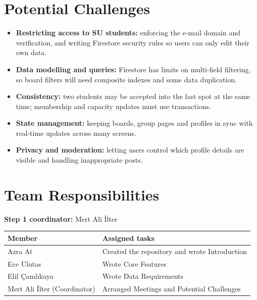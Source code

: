 \documentclass[11pt,a4paper]{article}
\begin{document}
\section{Potential Challenges}

\begin{itemize}
  \item \textbf{Restricting access to SU students:} enforcing the e-mail
        domain and verification, and writing Firestore security rules so users
        can only edit their own data.
  \item \textbf{Data modelling and queries:} Firestore has limits on
        multi-field filtering, so board filters will need composite indexes
        and some data duplication.
  \item \textbf{Consistency:} two students may be accepted into the last spot
        at the same time; membership and capacity updates must use
        transactions.
  \item \textbf{State management:} keeping boards, group pages and profiles
        in sync with real-time updates across many screens.
  \item \textbf{Privacy and moderation:} letting users control which profile
        details are visible and handling inappropriate posts.
\end{itemize}

\section{Team Responsibilities}

\textbf{Step 1 coordinator:} Mert Ali İlter 

\vspace{0.5ex}
\begin{tabularx}{\textwidth}{@{}lX@{}}
  \toprule
  \textbf{Member} & \textbf{Assigned tasks} \\
  \midrule
  Azra At & Created the repository and wrote Introduction \\
  Ece Ulutas & Wrote Core Features \\
  Elif Çamlıkaya & Wrote Data Requirements\\
  Mert Ali İlter (Coordinator) & Arranged Meetings and Potential Challenges \\

  \bottomrule
\end{tabularx}
\end{document}
